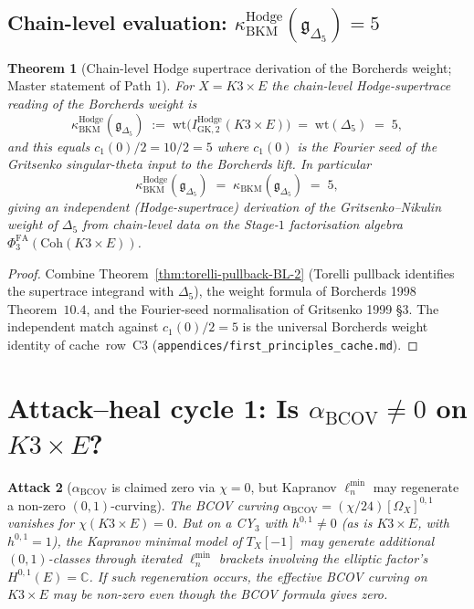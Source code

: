 \documentclass[11pt]{article}
\newtheorem{theorem}{Theorem}[section]
\newtheorem{attack}[theorem]{Attack}
\providecommand{\BCOV}{\mathrm{BCOV}}
\providecommand{\Coh}{\mathrm{Coh}}
\providecommand{\Om}{\Omega}
\providecommand{\fg}{\mathfrak{g}}
\providecommand{\CC}{\mathbb{C}}
\providecommand{\kBKM}{\kappa_{\mathrm{BKM}}}
\providecommand{\kHodge}{\kappa_{\mathrm{BKM}}^{\mathrm{Hodge}}}
\providecommand{\PhiFA}{\Phi^{\mathrm{FA}}}
\begin{document}
\subsection{Chain-level evaluation: $\kHodge(\fg_{\Delta_5}) = 5$}

\begin{theorem}[Chain-level Hodge supertrace derivation of the Borcherds weight; Master statement of Path 1]
\label{thm:bl-hodge-k3e-kappa5-wave}
For $X = K3 \times E$ the chain-level Hodge-supertrace reading of the
Borcherds weight is
\[
  \kHodge(\fg_{\Delta_5})
  \;:=\; \mathrm{wt}\!\bigl(
    I^{\mathrm{Hodge}}_{\mathrm{GK}, 2}(K3 \times E)
  \bigr)
  \;=\; \mathrm{wt}(\Delta_5)
  \;=\; 5,
\]
and this equals $c_1(0)/2 = 10/2 = 5$ where $c_1(0)$ is the Fourier
seed of the Gritsenko singular-theta input to the Borcherds lift.
In particular
\[
  \kHodge(\fg_{\Delta_5}) \;=\; \kBKM(\fg_{\Delta_5}) \;=\; 5,
\]
giving an \emph{independent} (Hodge-supertrace) derivation of the
Gritsenko--Nikulin weight of $\Delta_5$ from chain-level data on the
Stage-$1$ factorisation algebra $\PhiFA_3(\Coh(K3 \times E))$.
\end{theorem}

\begin{proof}
Combine Theorem~\ref{thm:torelli-pullback-BL-2} (Torelli pullback
identifies the supertrace integrand with $\Delta_5$), the weight
formula of Borcherds 1998 Theorem~$10.4$, and the Fourier-seed
normalisation of Gritsenko 1999 \S$3$. The independent match against
$c_1(0)/2 = 5$ is the universal Borcherds weight identity of
cache~row~C3 (\texttt{appendices/first\_principles\_cache.md}).
\end{proof}

\section{Attack--heal cycle 1: Is $\alpha_\BCOV \neq 0$ on $K3 \times E$?}
\label{sec:attack-cycle-1}

\begin{attack}[$\alpha_\BCOV$ is claimed zero via $\chi = 0$, but Kapranov $\ell_n^{\min}$ may regenerate a non-zero $(0, 1)$-curving]
\label{att:bcov-regenerate-BL-2}
The BCOV curving $\alpha_\BCOV = (\chi/24)[\Om_X]^{0, 1}$ vanishes for
$\chi(K3 \times E) = 0$. But on a CY$_3$ with $h^{0, 1} \neq 0$ (as is
$K3 \times E$, with $h^{0, 1} = 1$), the Kapranov minimal model of
$T_X[-1]$ may generate additional $(0, 1)$-classes through iterated
$\ell_n^{\min}$ brackets involving the elliptic factor's $H^{0, 1}(E) = \CC$.
If such regeneration occurs, the effective BCOV curving on $K3 \times E$
may be non-zero even though the BCOV formula gives zero.
\end{attack}
\end{document}
